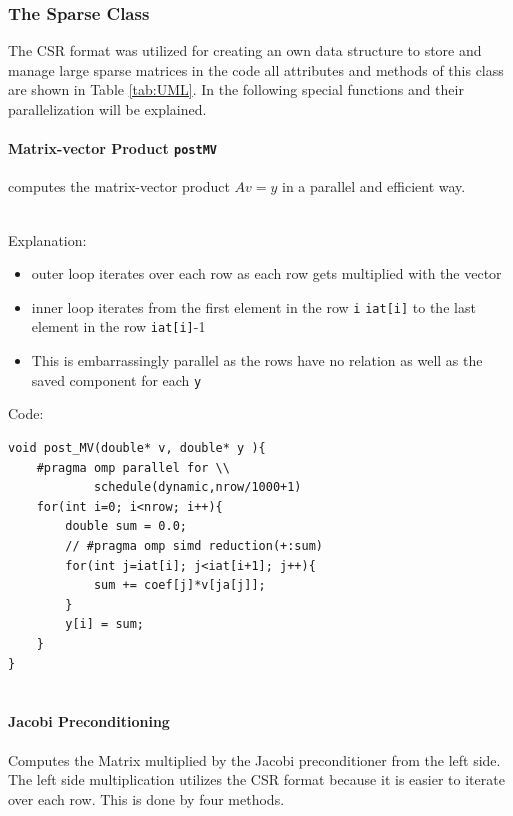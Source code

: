 \documentclass{article}
\begin{document}
\subsubsection{The Sparse Class}
The CSR format was utilized for creating an own data structure to store and manage large sparse matrices in the code all attributes and methods of this class are shown in Table \ref{tab:UML}. In the following special functions and their parallelization will be explained.



\paragraph{Matrix-vector Product \lstinline|postMV|} computes the matrix-vector product $Av=y$ in a parallel and efficient way.\\\\
\begin{minipage}[t]{0.45\textwidth}
Explanation:
\begin{itemize}
    \item outer loop iterates over each row as each row gets multiplied with the vector
    \item inner loop iterates from the first element in the row \lstinline|i| \lstinline |iat[i]| to the last element in the row \lstinline |iat[i]|-1
    \item This is embarrassingly parallel as the rows have no relation as well as the saved component for each \lstinline|y|
\end{itemize}
\end{minipage}
\hspace{0.7cm}
\begin{minipage}[t]{0.35\textwidth}
Code:
\begin{verbatim}
void post_MV(double* v, double* y ){
    #pragma omp parallel for \\
            schedule(dynamic,nrow/1000+1)
    for(int i=0; i<nrow; i++){
        double sum = 0.0;
        // #pragma omp simd reduction(+:sum)
        for(int j=iat[i]; j<iat[i+1]; j++){
            sum += coef[j]*v[ja[j]];
        }
        y[i] = sum;
    }
}


\end{verbatim}
\end{minipage}

\paragraph{Jacobi Preconditioning}
Computes the Matrix multiplied by the Jacobi preconditioner from the left side. The left side multiplication utilizes the CSR format because it is easier to iterate over each row. This is done by four methods.\\\\
\end{document}
